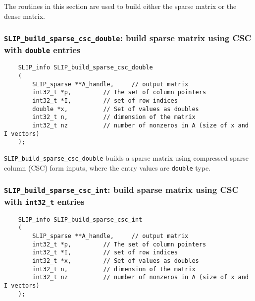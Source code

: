 \documentclass[12pt]{article}
\theoremstyle{definition}
\begin{document}
The routines in this section are used to build either the sparse matrix or the
dense matrix.

\cprotect\subsubsection{\verb|SLIP_build_sparse_csc_double|: build sparse matrix using CSC with \verb|double| entries}
\label{s:user:build_sparse_csc_double}

\begin{mdframed}[userdefinedwidth=6in]
{\footnotesize
\begin{verbatim}
    SLIP_info SLIP_build_sparse_csc_double
    (
        SLIP_sparse **A_handle,     // output matrix
        int32_t *p,         // The set of column pointers
        int32_t *I,         // set of row indices
        double *x,          // Set of values as doubles
        int32_t n,          // dimension of the matrix
        int32_t nz          // number of nonzeros in A (size of x and I vectors)
    );
\end{verbatim}
} \end{mdframed}

\verb|SLIP_build_sparse_csc_double| builds a sparse matrix using compressed
sparse column (CSC) form inputs, where the entry values are \verb|double| type.

\cprotect\subsubsection{\verb|SLIP_build_sparse_csc_int|: build sparse matrix using CSC with \verb|int32_t| entries}
\label{s:user:build_sparse_csc_int}

\begin{mdframed}[userdefinedwidth=6in]
{\footnotesize
\begin{verbatim}
    SLIP_info SLIP_build_sparse_csc_int
    (
        SLIP_sparse **A_handle,     // output matrix
        int32_t *p,         // The set of column pointers
        int32_t *I,         // set of row indices
        int32_t *x,         // Set of values as doubles
        int32_t n,          // dimension of the matrix
        int32_t nz          // number of nonzeros in A (size of x and I vectors)
    );
\end{verbatim}
} \end{mdframed}
\end{document}
